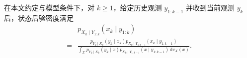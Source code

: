 \begin{theorem}\label{cw:thm:bayes}

在本文约定与模型条件下，对 $k\geq1$，给定历史观测 $y_{1:k-1}$ 并收到当前观测 $y_k$ 后，状态后验密度满足
\begin{equation}\label{cw:eq:15}
\begin{aligned}
&p_{X_k\mid Y_{1:k}}(x_k\mid y_{1:k})\\
= &\frac{p_{Y_k\mid X_k}(y_k\mid x_k)p_{X_k\mid Y_{1:k-1}}(x_k\mid y_{1:k-1})}
{\displaystyle\int_{\mathcal{X}}p_{Y_k\mid X_k}(y_k\mid x)p_{X_k\mid Y_{1:k-1}}(x\mid y_{1:k-1})\,\mathrm{d}v_X(x)}.
\end{aligned}
\end{equation}

\end{theorem}

